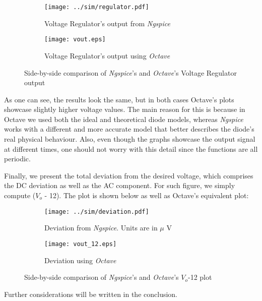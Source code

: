 \begin{figure}[H]
\centering
\begin{subfigure}{.5\textwidth}
  \centering
  \texttt{[image: ../sim/regulator.pdf]}
  \caption{Voltage Regulator's output from \textit{Ngspice}}
  \label{fig:RegulatorNGSPICE}
\end{subfigure}%
\begin{subfigure}{.5\textwidth}
  \centering
  \texttt{[image: vout.eps]}
  \caption{Voltage Regulator's output using \textit{Octave}}
  \label{fig:RegulatorOCTAVE}
\end{subfigure}
\caption{Side-by-side comparison of \textit{Ngspice}'s and \textit{Octave}'s Voltage Regulator output}
\label{fig:RegulatorComparacao}
\end{figure}

As one can see, the results look the same, but in both cases Octave's plots showcase slightly higher voltage values. The main reason for this is because in Octave we used both the ideal and theoretical diode models, whereas \textit{Ngspice} works with a different and
more accurate model that better describes the diode's real physical behaviour. Also, even though the graphs showcase the output signal at different times, one should not worry with this detail since the functions are all periodic.

Finally, we present the total deviation from the desired voltage, which comprises the DC deviation as well as the AC component. For such figure, we simply compute ($V_o$ - 12). The plot is shown below as well as Octave's equivalent plot:
\begin{figure}[H]
\centering
\begin{subfigure}{.5\textwidth}
  \centering
  \texttt{[image: ../sim/deviation.pdf]}
  \caption{Deviation from \textit{Ngspice}. Units are in $\mu$ V}
  \label{fig:DeviationNGSPICE}
\end{subfigure}%
\begin{subfigure}{.5\textwidth}
  \centering
  \texttt{[image: vout\_12.eps]}
  \caption{Deviation using \textit{Octave}}
  \label{fig:DeviationOCTAVE}
\end{subfigure}
\caption{Side-by-side comparison of \textit{Ngspice}'s and \textit{Octave}'s $V_o$-12 plot}
\label{fig:RegulatorComparacao}
\end{figure}

Further considerations will be written in the conclusion.
